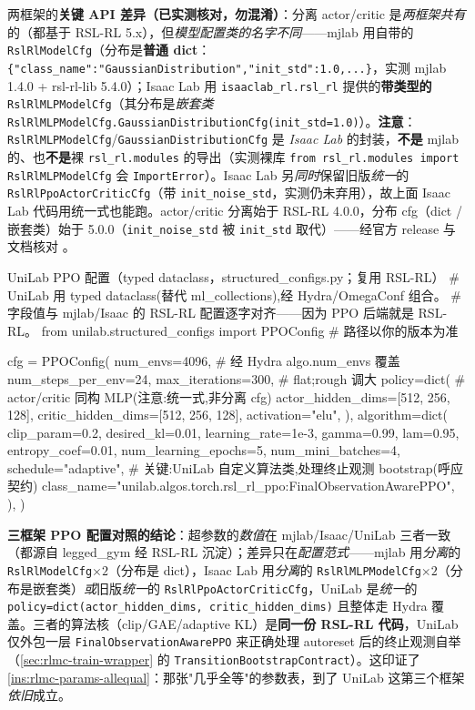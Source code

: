 \begin{note}
两框架的\textbf{关键 API 差异（已实测核对，勿混淆）}：分离 actor/critic 是\emph{两框架共有}的（都基于 RSL-RL 5.x），但\emph{模型配置类的名字不同}——mjlab 用自带的 \verb|RslRlModelCfg|（分布是\textbf{普通 dict}：\verb|{"class_name":"GaussianDistribution","init_std":1.0,...}|，实测 mjlab 1.4.0 + rsl-rl-lib 5.4.0）；Isaac Lab 用 \verb|isaaclab_rl.rsl_rl| 提供的\textbf{带类型的} \verb|RslRlMLPModelCfg|（其分布是\emph{嵌套类} \verb|RslRlMLPModelCfg.GaussianDistributionCfg(init_std=1.0)|）。\textbf{注意}：\verb|RslRlMLPModelCfg|/\verb|GaussianDistributionCfg| 是 \emph{Isaac Lab} 的封装，\textbf{不是} mjlab 的、也\textbf{不是}裸 \verb|rsl_rl.modules| 的导出（实测裸库 \verb|from rsl_rl.modules import RslRlMLPModelCfg| 会 \verb|ImportError|）。Isaac Lab 另\emph{同时}保留旧版\emph{统一}的 \verb|RslRlPpoActorCriticCfg|（带 \verb|init_noise_std|，实测仍未弃用），故上面 Isaac Lab 代码用统一式也能跑。actor/critic 分离始于 RSL-RL 4.0.0，分布 cfg（dict / 嵌套类）始于 5.0.0（\verb|init_noise_std| 被 \verb|init_std| 取代）——经官方 release 与文档核对 \cite{schwarke2025rslrl}。
\end{note}

\begin{codebox}[Python]{UniLab PPO 配置（typed dataclass，structured\_configs.py；复用 RSL-RL）}
# UniLab 用 typed dataclass(替代 ml_collections),经 Hydra/OmegaConf 组合。
# 字段值与 mjlab/Isaac 的 RSL-RL 配置逐字对齐——因为 PPO 后端就是 RSL-RL。
from unilab.structured_configs import PPOConfig   # 路径以你的版本为准

cfg = PPOConfig(
    num_envs=4096,                 # 经 Hydra algo.num_envs 覆盖
    num_steps_per_env=24,
    max_iterations=300,            # flat;rough 调大
    policy=dict(                   # actor/critic 同构 MLP(注意:统一式,非分离 cfg)
        actor_hidden_dims=[512, 256, 128],
        critic_hidden_dims=[512, 256, 128],
        activation="elu",
    ),
    algorithm=dict(
        clip_param=0.2, desired_kl=0.01, learning_rate=1e-3,
        gamma=0.99, lam=0.95, entropy_coef=0.01,
        num_learning_epochs=5, num_mini_batches=4, schedule="adaptive",
        # 关键:UniLab 自定义算法类,处理终止观测 bootstrap(呼应契约)
        class_name="unilab.algos.torch.rsl_rl_ppo:FinalObservationAwarePPO",
    ),
)
\end{codebox}

\begin{note}
\textbf{三框架 PPO 配置对照的结论}：超参数的\emph{数值}在 mjlab/Isaac/UniLab 三者一致（都源自 legged\_gym \cite{rudin2022legged} 经 RSL-RL 沉淀）；差异只在\emph{配置范式}——mjlab 用\emph{分离}的 \verb|RslRlModelCfg|$\times2$（分布是 dict），Isaac Lab 用\emph{分离}的 \verb|RslRlMLPModelCfg|$\times2$（分布是嵌套类）\emph{或}旧版\emph{统一}的 \verb|RslRlPpoActorCriticCfg|，UniLab 是\emph{统一}的 \verb|policy=dict(actor_hidden_dims, critic_hidden_dims)| 且整体走 Hydra 覆盖。三者的算法核（clip/GAE/adaptive KL）是\textbf{同一份 RSL-RL 代码}，UniLab 仅外包一层 \verb|FinalObservationAwarePPO| 来正确处理 autoreset 后的终止观测自举（\cref{sec:rlmc-train-wrapper} 的 \verb|TransitionBootstrapContract|）。这印证了 \cref{ins:rlmc-params-allequal}：那张"几乎全等"的参数表，到了 UniLab 这第三个框架\emph{依旧}成立。
\end{note}

